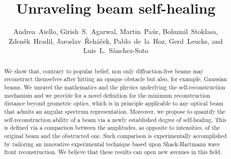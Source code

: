 \documentclass[10pt]{article}
\begin{document}
\title{Unraveling beam self-healing}

\author{Andrea~Aiello,{} 
 Girish~S.~Agarwal,{}
 Martin~Pa\'{u}r,{} 
Bohumil~Stoklasa,{}
Zden\v{e}k~Hradil,{}
Jaroslav~\v{R}eh\'{a}\v{c}ek,{} 
Pablo~de~la~Hoz,{} 
Gerd~Leuchs,{} and 
Luis~L.~S\'anchez-Soto{}} 

\address{
Max Planck Institut f\"ur die Physik des Lichts,
  Staudtstra\ss e 2, 91058 Erlangen, Germany \\
Institut f\"ur Theoretische Physik II, Friedrich-Alexander 
  Universit\"{a}t Erlangen-N\"{u}rnberg, Staudtstra\ss e 2,
  91058~Erlangen, Germany \\
Institute for Quantum Science and Engineering 
 and Department of Biological and Agricultural Engineering, 
 Texas A\&M University, College~Station, Texas~77845, USA \\
Department of Physics, Oklahoma State University,
  Stillwater, Oklahoma 74078, USA \\
Department of Optics,  Palack\'y  University, 
17.~listopadu 12, 771 46 Olomouc,  Czech Republic\\
Departamento de \'Optica, Facultad de F\'{\i}sica,
 Universidad Complutense, 28040~Madrid,  Spain} 



\begin{abstract}
  We show that, contrary to popular belief, non only diffraction-free
  beams may reconstruct themselves after hitting an opaque obstacle
  but also, for example, Gaussian beams.  We unravel the mathematics
  and the physics underlying the self-reconstruction mechanism and we
  provide for a novel definition for the minimum reconstruction
  distance beyond geometric optics, which is in principle applicable
  to any optical beam that admits an angular spectrum representation.
  Moreover, we propose to quantify the self-reconstruction ability of
  a beam via a newly established degree of self-healing. This is
  defined via a comparison between the amplitudes, as opposite to
  intensities, of the original beam and the obstructed one. Such
  comparison is experimentally accomplished by tailoring an innovative
  experimental technique based upon Shack-Hartmann wave front
  reconstruction.  We believe that these results can open new avenues
  in this field.
\end{abstract}
\end{document}

